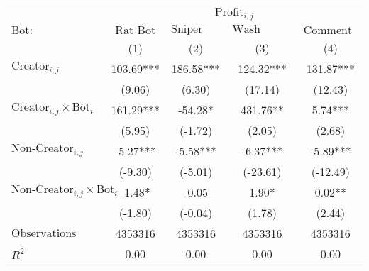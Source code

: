 \begin{tabular}{lcccc}
\toprule
 & \multicolumn{4}{c}{$\text{Profit}_{i,j}$} \\
\cline{2-5}
 $\text{Bot}:$ & $\text{Rat Bot}$ & $\text{Sniper Bot}$ & $\text{Wash Trading Bot}$ & $\text{Comment Bot}$ \\
 & (1) & (2) & (3) & (4)\\
\midrule
$\text{Creator}_{i,j}$ & 103.69*** & 186.58*** & 124.32*** & 131.87*** \\
 & (9.06) & (6.30) & (17.14) & (12.43) \\
$\text{Creator}_{i,j} \times \text{Bot}_i$ & 161.29*** & -54.28* & 431.76** & 5.74*** \\
 & (5.95) & (-1.72) & (2.05) & (2.68) \\
$\text{Non-Creator}_{i,j}$ & -5.27*** & -5.58*** & -6.37*** & -5.89*** \\
 & (-9.30) & (-5.01) & (-23.61) & (-12.49) \\
$\text{Non-Creator}_{i,j} \times \text{Bot}_i$ & -1.48* & -0.05 & 1.90* & 0.02** \\
 & (-1.80) & (-0.04) & (1.78) & (2.44) \\
\midrule
$\text{Observations}$ & 4353316 & 4353316 & 4353316 & 4353316 \\
$R^2$ & 0.00 & 0.00 & 0.00 & 0.00 \\
\bottomrule
\end{tabular}